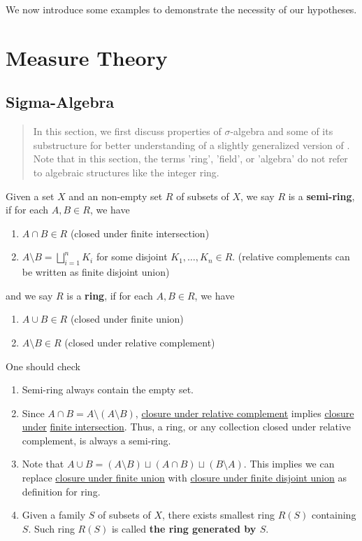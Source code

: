 \documentclass{report}
\begin{document}
\begin{mdframed}
We now introduce some examples to demonstrate the necessity of our hypotheses. 
\end{mdframed}
\chapter{Measure Theory}

\section{Sigma-Algebra} 
\begin{abstract}
In this section, we first discuss properties of $\sigma$-algebra and some of its substructure for better understanding of a slightly generalized version of . Note that in this section, the terms 'ring', 'field', or 'algebra' do not refer to algebraic structures like the integer ring. 
\end{abstract}
\begin{mdframed}
Given a set $X$ and an non-empty set $R$ of subsets of $X$, we say  $R$ is a \textbf{semi-ring}, if for each $A,B \in R$, we have 
\begin{enumerate}[label=(\alph*)]
  \item $A\cap B \in R$ (closed under finite intersection)
  \item  $A\setminus B=\bigsqcup_{i=1}^n K_i$ for some disjoint $K_1,\dots ,K_n \in R$. (relative complements can be written as finite disjoint union)
\end{enumerate}
and we say $R$ is a \textbf{ring}, if for each $A,B \in R$, we have 
\begin{enumerate}[label=(\alph*)]
  \item $A\cup B \in R$ (closed under finite union)
  \item $A\setminus  B \in R$ (closed under relative complement)
\end{enumerate}
One should check 
\begin{enumerate}[label=(\alph*)]
\label{c_ring}
  \item Semi-ring always contain the empty set.
\item Since $A\cap B=A\setminus (A\setminus B)$, \underline{closure under relative complement} implies \underline{closure under} \underline{finite intersection}. Thus, a ring, or any collection closed under relative complement, is always a semi-ring.
\item Note that $A\cup B=(A\setminus B)\sqcup (A\cap B) \sqcup  (B\setminus A)$. This implies we can replace  \underline{closure under finite union} with \underline{closure under finite disjoint union} as definition for ring. 
  \item Given a family $S$ of subsets of $X$, there exists smallest ring  $R(S)$ containing $S$. Such ring $R(S)$ is called \textbf{the ring generated by $S$}. 
\end{enumerate}
\end{mdframed}
\end{document}
